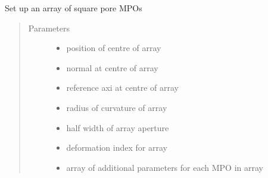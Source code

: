 \documentclass[letterpaper,10pt,english]{sphinxmanual}
\begin{document}
\begin{fulllineitems}
\label{\detokenize{xsrt_functions:xsrt.sqmpoarr}}
Set up an array of square pore MPOs
\begin{quote}\begin{description}
\item[{Parameters}] \leavevmode\begin{itemize}
\item {} 
 \textendash{} position of centre of array

\item {} 
 \textendash{} normal at centre of array

\item {} 
 \textendash{} reference axi at centre of array

\item {} 
 \textendash{} radius of curvature of array

\item {} 
 \textendash{} half width of array aperture

\item {} 
 \textendash{} deformation index for array

\item {} 
 \textendash{} array of additional parameters for each MPO in array

\end{itemize}


\end{description}
\end{quote}
\end{fulllineitems}
\end{document}
